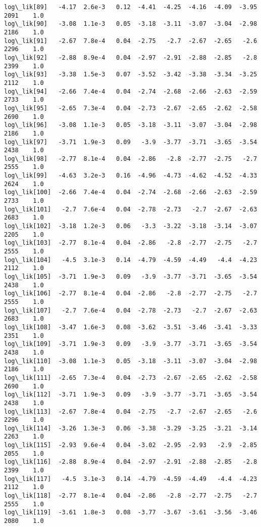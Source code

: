 \documentclass[11pt]{article}
\begin{document}
\begin{Verbatim}[commandchars=\\\{\}]
log\_lik[89]   -4.17  2.6e-3   0.12  -4.41  -4.25  -4.16  -4.09  -3.95   2091    1.0
log\_lik[90]   -3.08  1.1e-3   0.05  -3.18  -3.11  -3.07  -3.04  -2.98   2186    1.0
log\_lik[91]   -2.67  7.8e-4   0.04  -2.75   -2.7  -2.67  -2.65   -2.6   2296    1.0
log\_lik[92]   -2.88  8.9e-4   0.04  -2.97  -2.91  -2.88  -2.85   -2.8   2399    1.0
log\_lik[93]   -3.38  1.5e-3   0.07  -3.52  -3.42  -3.38  -3.34  -3.25   2112    1.0
log\_lik[94]   -2.66  7.4e-4   0.04  -2.74  -2.68  -2.66  -2.63  -2.59   2733    1.0
log\_lik[95]   -2.65  7.3e-4   0.04  -2.73  -2.67  -2.65  -2.62  -2.58   2690    1.0
log\_lik[96]   -3.08  1.1e-3   0.05  -3.18  -3.11  -3.07  -3.04  -2.98   2186    1.0
log\_lik[97]   -3.71  1.9e-3   0.09   -3.9  -3.77  -3.71  -3.65  -3.54   2438    1.0
log\_lik[98]   -2.77  8.1e-4   0.04  -2.86   -2.8  -2.77  -2.75   -2.7   2555    1.0
log\_lik[99]   -4.63  3.2e-3   0.16  -4.96  -4.73  -4.62  -4.52  -4.33   2624    1.0
log\_lik[100]  -2.66  7.4e-4   0.04  -2.74  -2.68  -2.66  -2.63  -2.59   2733    1.0
log\_lik[101]   -2.7  7.6e-4   0.04  -2.78  -2.73   -2.7  -2.67  -2.63   2683    1.0
log\_lik[102]  -3.18  1.2e-3   0.06   -3.3  -3.22  -3.18  -3.14  -3.07   2205    1.0
log\_lik[103]  -2.77  8.1e-4   0.04  -2.86   -2.8  -2.77  -2.75   -2.7   2555    1.0
log\_lik[104]   -4.5  3.1e-3   0.14  -4.79  -4.59  -4.49   -4.4  -4.23   2112    1.0
log\_lik[105]  -3.71  1.9e-3   0.09   -3.9  -3.77  -3.71  -3.65  -3.54   2438    1.0
log\_lik[106]  -2.77  8.1e-4   0.04  -2.86   -2.8  -2.77  -2.75   -2.7   2555    1.0
log\_lik[107]   -2.7  7.6e-4   0.04  -2.78  -2.73   -2.7  -2.67  -2.63   2683    1.0
log\_lik[108]  -3.47  1.6e-3   0.08  -3.62  -3.51  -3.46  -3.41  -3.33   2351    1.0
log\_lik[109]  -3.71  1.9e-3   0.09   -3.9  -3.77  -3.71  -3.65  -3.54   2438    1.0
log\_lik[110]  -3.08  1.1e-3   0.05  -3.18  -3.11  -3.07  -3.04  -2.98   2186    1.0
log\_lik[111]  -2.65  7.3e-4   0.04  -2.73  -2.67  -2.65  -2.62  -2.58   2690    1.0
log\_lik[112]  -3.71  1.9e-3   0.09   -3.9  -3.77  -3.71  -3.65  -3.54   2438    1.0
log\_lik[113]  -2.67  7.8e-4   0.04  -2.75   -2.7  -2.67  -2.65   -2.6   2296    1.0
log\_lik[114]  -3.26  1.3e-3   0.06  -3.38  -3.29  -3.25  -3.21  -3.14   2263    1.0
log\_lik[115]  -2.93  9.6e-4   0.04  -3.02  -2.95  -2.93   -2.9  -2.85   2055    1.0
log\_lik[116]  -2.88  8.9e-4   0.04  -2.97  -2.91  -2.88  -2.85   -2.8   2399    1.0
log\_lik[117]   -4.5  3.1e-3   0.14  -4.79  -4.59  -4.49   -4.4  -4.23   2112    1.0
log\_lik[118]  -2.77  8.1e-4   0.04  -2.86   -2.8  -2.77  -2.75   -2.7   2555    1.0
log\_lik[119]  -3.61  1.8e-3   0.08  -3.77  -3.67  -3.61  -3.56  -3.46   2080    1.0

\end{Verbatim}
\end{document}
